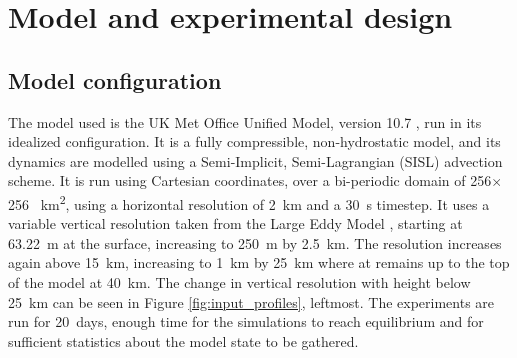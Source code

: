\documentclass[11pt,a4paper]{article}
\begin{document}
\section{Model and experimental design}

\subsection{Model configuration}


The model used is the UK Met Office Unified Model, version 10.7 \parencite{walters2017met}, run in its idealized configuration. It is a fully compressible, non-hydrostatic model, and its dynamics are modelled using a Semi-Implicit, Semi-Lagrangian (SISL) advection scheme. It is run using Cartesian coordinates, over a bi-periodic domain of 256$\times$256 \SI{}{km^2}, using a horizontal resolution of \SI{2}{km} and a \SI{30}{s} timestep. It uses a variable vertical resolution taken from the Large Eddy Model \parencite{todocite}, starting at \SI{63.22}{m} at the surface, increasing to \SI{250}{m} by \SI{2.5}{km}. The resolution increases again above \SI{15}{km}, increasing to \SI{1}{km} by \SI{25}{km} where at remains up to the top of the model at \SI{40}{km}. The change in vertical resolution with height below \SI{25}{km} can be seen in Figure \ref{fig:input_profiles}, leftmost.
The experiments are run for \SI{20}{days}, enough time for the simulations to reach equilibrium and for sufficient statistics about the model state to be gathered. 
\end{document}
